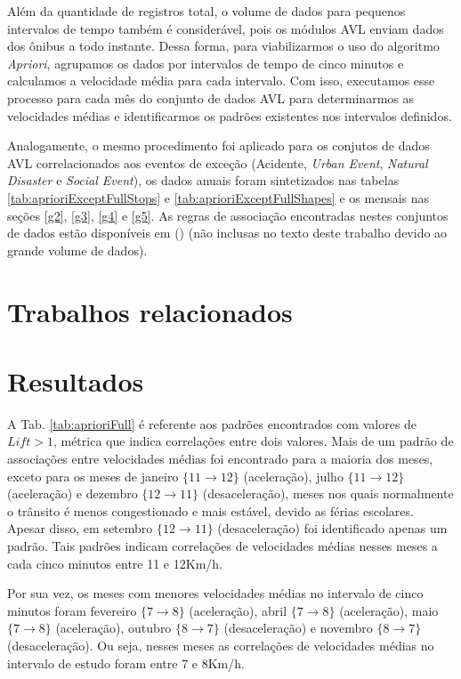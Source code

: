 \documentclass[
	12pt,				%
	oneside,			%
	a4paper,			%
	english,			%
	brazil				%
	]{abntex2ppgsi}
\begin{document}
{{Além da quantidade de registros total, o volume de dados para pequenos intervalos de tempo também é considerável, pois os módulos AVL enviam dados dos ônibus a todo instante. Dessa forma, para viabilizarmos o uso do algoritmo \textit{Apriori}, agrupamos os dados por intervalos de tempo de cinco minutos e calculamos a velocidade média para cada intervalo. Com isso, executamos esse processo para cada mês do conjunto de dados AVL para determinarmos as velocidades médias e identificarmos os padrões existentes nos intervalos definidos.

Analogamente, o mesmo procedimento foi aplicado para os conjutos de dados AVL correlacionados aos eventos de exceção (Acidente, \textit{Urban Event}, \textit{Natural Disaster} e \textit{Social Event}), os dados anuais foram sintetizados nas tabelas \ref{tab:aprioriExceptFullStops} e \ref{tab:aprioriExceptFullShapes} e os mensais nas seções \ref{g2}, \ref{g3}, \ref{g4} e \ref{g5}. As regras de associação encontradas nestes conjuntos de dados estão disponíveis em \citeauthor{fcas} (\citeyear{fcas}) (não inclusas no texto deste trabalho devido ao  grande volume de dados). 

\section{Trabalhos relacionados}

\section{Resultados}

A Tab. \ref{tab:aprioriFull} é referente aos padrões encontrados com valores de $\textit{Lift} > 1$, métrica que indica correlações entre dois valores. Mais de um padrão de associações entre velocidades médias foi encontrado para a maioria dos meses, exceto para os meses de janeiro $\lbrace 11 \rightarrow 12 \rbrace$ (aceleração), julho $\lbrace 11 \rightarrow 12\rbrace$ (aceleração) e dezembro $\lbrace12 \rightarrow 11\rbrace$ (desaceleração), meses nos quais normalmente o trânsito é menos congestionado e mais estável, devido as férias escolares. Apesar disso, em setembro $\lbrace12 \rightarrow 11\rbrace$ (desaceleração) foi identificado apenas um padrão. Tais padrões indicam correlações de velocidades médias nesses meses a cada cinco minutos entre 11 e 12Km/h.

Por sua vez, os meses com menores velocidades médias no intervalo de cinco minutos foram fevereiro $\lbrace 7 \rightarrow 8\rbrace$ (aceleração), abril $\lbrace 7 \rightarrow 8 \rbrace$ (aceleração), maio $\lbrace7 \rightarrow 8\rbrace$ (aceleração), outubro $\lbrace8 \rightarrow 7\rbrace$ (desaceleração) e novembro $\lbrace8 \rightarrow 7\rbrace$ (desaceleração). Ou seja, nesses meses as correlações de velocidades médias no intervalo de estudo foram entre 7 e 8Km/h.

}}
\end{document}
